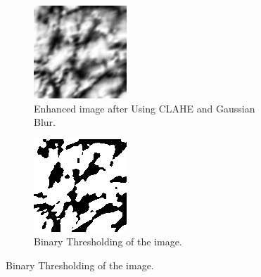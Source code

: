 \begin{enumerate}
    \begin{figure}[!ht]
        \centering
        \begin{subfigure}[t]{0.48\columnwidth}
            \includegraphics[width=\textwidth]{./images/preprocessing/enhanced_image.png}
            \caption{Enhanced image after Using CLAHE and Gaussian Blur.}
            \label{fig:enhanced_image}
        \end{subfigure}
        \hfill
        \begin{subfigure}[t]{0.48\columnwidth}
            \includegraphics[width=\textwidth]{./images/preprocessing/binarize_image.png}
            \caption{Binary Thresholding of the image.}
            \label{fig:binarize_image}
        \end{subfigure}
    \end{figure}


\end{enumerate}
